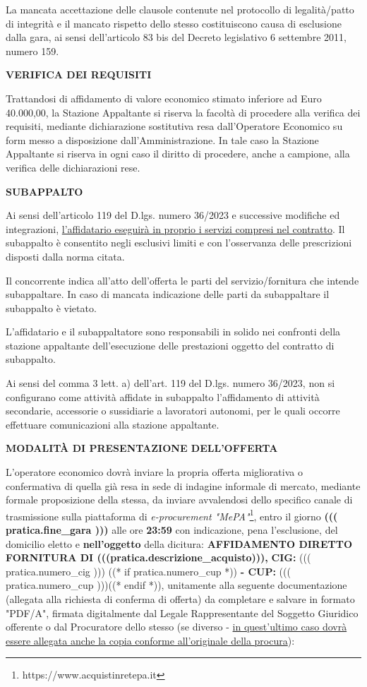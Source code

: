 La mancata accettazione delle clausole contenute nel protocollo
di legalità/patto di integrità e il mancato rispetto dello stesso
costituiscono causa di esclusione dalla gara, ai sensi dell'articolo
83 bis del Decreto legislativo 6 settembre 2011, numero 159.

\textbf{VERIFICA DEI REQUISITI}

Trattandosi di affidamento di valore economico stimato inferiore
ad Euro 40.000,00, la Stazione Appaltante si riserva la facoltà
di procedere alla verifica dei requisiti, mediante dichiarazione
sostitutiva resa dall'Operatore Economico su form messo a disposizione
dall'Amministrazione. In tale caso la Stazione Appaltante si riserva
in ogni caso il diritto di procedere, anche a campione, alla verifica
delle dichiarazioni rese.

\textbf{SUBAPPALTO}

Ai sensi dell'articolo 119 del D.lgs. numero 36/2023 e successive
modifiche ed integrazioni,
\ul{l'affidatario eseguir\`a in proprio i servizi compresi nel
contratto}. Il subappalto è consentito negli esclusivi limiti e con
l'osservanza delle prescrizioni disposti dalla norma citata.

Il concorrente indica all'atto dell'offerta le parti del
servizio/fornitura che intende subappaltare. In caso di mancata
indicazione delle parti da subappaltare il subappalto è vietato. 

L'affidatario e il subappaltatore sono responsabili in solido nei
confronti della stazione appaltante dell'esecuzione delle prestazioni
oggetto del contratto di subappalto.

Ai sensi del comma 3 lett. a) dell'art. 119 del D.lgs. numero 36/2023,
non si configurano come attività affidate in subappalto l'affidamento
di attività secondarie, accessorie o sussidiarie a lavoratori autonomi,
per le quali occorre effettuare comunicazioni alla stazione appaltante.

\textbf{MODALITÀ DI PRESENTAZIONE DELL'OFFERTA}

L'operatore economico dovrà inviare la propria offerta migliorativa
o confermativa di quella già resa in sede di indagine informale
di mercato, mediante formale proposizione della stessa, da inviare
avvalendosi dello specifico canale di trasmissione sulla piattaforma di
\textit{e-procurement "MePA"}\footnote{https://www.acquistinretepa.it},
entro il giorno \textbf{((( pratica.fine_gara )))} alle ore
\textbf{23:59} con indicazione, pena l'esclusione, del domicilio
eletto e \textbf{nell'oggetto} della dicitura: \textbf{AFFIDAMENTO
DIRETTO FORNITURA DI (((pratica.descrizione_acquisto))),} \textbf{CIG:}
((( pratica.numero_cig )))%
((* if pratica.numero_cup *)) \textbf{ - CUP:} ((( pratica.numero_cup )))((* endif *)),
unitamente alla seguente documentazione (allegata alla richiesta di conferma di offerta)
da completare e salvare in formato "PDF/A", firmata digitalmente dal
Legale Rappresentante del Soggetto Giuridico offerente o dal Procuratore
dello stesso (se diverso - \ul{in quest'ultimo caso dovr\`a essere
allegata anche la copia conforme all'originale della procura}):

